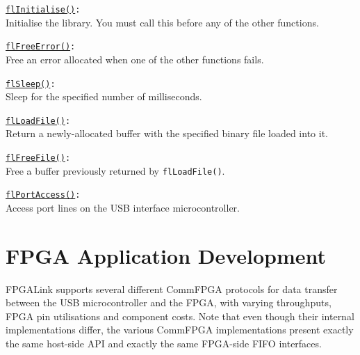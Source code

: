 \begin{desc}
  \item[\texttt{\href{http://www.swaton.ukfsn.org/bin/fpgalink-MAKESTUFF_TODAY_DATE/api/libfpgalink\_8h.html\#a973de7f601138a3e3bb8f6e184ee9be8}{flInitialise()}:}] \hfill \\
    Initialise the library. You must call this before any of the other functions.
  \item[\texttt{\href{http://www.swaton.ukfsn.org/bin/fpgalink-MAKESTUFF_TODAY_DATE/api/libfpgalink\_8h.html\#a313f24c559a56d12518cb1e7eacdf01b}{flFreeError()}:}] \hfill \\
    Free an error allocated when one of the other functions fails.
  \item[\texttt{\href{http://www.swaton.ukfsn.org/bin/fpgalink-MAKESTUFF_TODAY_DATE/api/libfpgalink\_8h.html\#a58a48f47195b55d4921659a74d9eed5d}{flSleep()}:}] \hfill \\
    Sleep for the specified number of milliseconds.
  \item[\texttt{\href{http://www.swaton.ukfsn.org/bin/fpgalink-MAKESTUFF_TODAY_DATE/api/libfpgalink\_8h.html\#ad2fd61ccae8632d5fa180d0c468257fb}{flLoadFile()}:}] \hfill \\
    Return a newly-allocated buffer with the specified binary file loaded into it.
  \item[\texttt{\href{http://www.swaton.ukfsn.org/bin/fpgalink-MAKESTUFF_TODAY_DATE/api/libfpgalink\_8h.html\#a17909597ec81d8610c791a1ebf5f1400}{flFreeFile()}:}] \hfill \\
    Free a buffer previously returned by \texttt{flLoadFile()}.
  \item[\texttt{\href{http://www.swaton.ukfsn.org/bin/fpgalink-MAKESTUFF_TODAY_DATE/api/libfpgalink\_8h.html\#ac7c58e9d3084a9367498b9576fca2805}{flPortAccess()}:}] \hfill \\
    Access port lines on the USB interface microcontroller.
\end{desc}

\newpage
\section{FPGA Application Development}
FPGALink supports several different CommFPGA protocols for data transfer between the USB microcontroller and the FPGA, with varying throughputs, FPGA pin utilisations and component costs. Note that even though their internal implementations differ, the various CommFPGA implementations present exactly the same host-side API and exactly the same FPGA-side FIFO interfaces.

